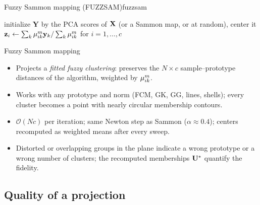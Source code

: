 \begin{algobox}{Fuzzy Sammon mapping (FUZZSAM)}{fuzzsam}
\begin{algorithm}[H]
initialize $\mathbf{Y}$ by the PCA scores of $\mathbf{X}$ (or a Sammon map, or at random), center it\;
$\mathbf{z}_i\leftarrow\sum_k\mu_{ik}^m\mathbf{y}_k/\sum_k\mu_{ik}^m$ for $i=1,\dots,c$\;
\end{algorithm}
\end{algobox}
\begin{summarybox}{Fuzzy Sammon mapping}
\begin{itemize}
  \item Projects a \emph{fitted fuzzy clustering}: preserves the $N\times c$ sample--prototype distances of the algorithm, weighted by $\mu_{ik}^m$.
  \item Works with any prototype and norm (FCM, GK, GG, lines, shells); every cluster becomes a point with nearly circular membership contours.
  \item $\mathcal{O}(Nc)$ per iteration; same Newton step as Sammon ($\alpha\approx0.4$); centers recomputed as weighted means after every sweep.
  \item Distorted or overlapping groups in the plane indicate a wrong prototype or a wrong number of clusters; the recomputed memberships $\mathbf{U}^*$ quantify the fidelity.
\end{itemize}
\end{summarybox}

\subsection{Quality of a projection}\label{sec:viz:quality}

